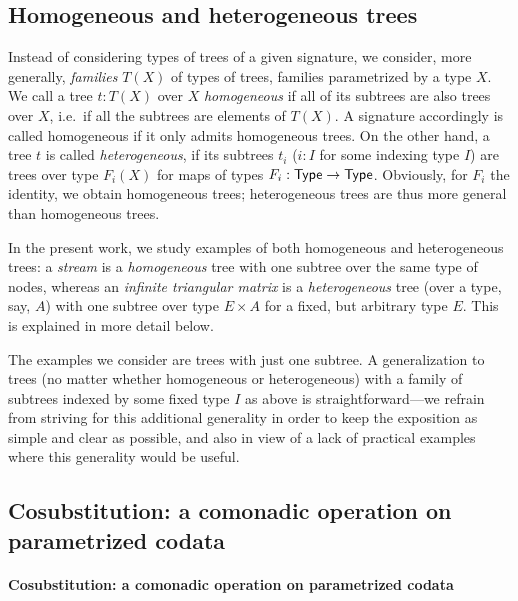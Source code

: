 \documentclass[a4paper,USenglish]{lipics}
\begin{document}
\subsection{Homogeneous and heterogeneous trees}\label{sec:hom_het}

Instead of considering types of trees of a given signature, we consider, more generally, \emph{families} $T(X)$ of types of trees, families parametrized by a type $X$.
We call a tree $t:T(X)$ over $X$ \emph{homogeneous} if all of its subtrees are also trees over $X$, i.e.\, if all the subtrees are elements of $T(X)$.
A signature accordingly is called homogeneous if it only admits homogeneous trees.
On the other hand, a tree $t$ is called \emph{heterogeneous}, if its subtrees $t_i$ ($i : I$ for some indexing type $I$) are trees over 
type $F_i(X)$ for maps of types $F_i : \mathsf{Type} \to \mathsf{Type}$. Obviously, for $F_i$ the identity, we obtain homogeneous trees; heterogeneous trees are thus more general than
homogeneous trees.

In the present work, we study examples of both homogeneous and heterogeneous trees: a \emph{stream} is a \emph{homogeneous} tree with one subtree over the same type of nodes,
whereas an \emph{infinite triangular matrix} is a \emph{heterogeneous} tree (over a type, say, $A$) with one subtree over type $E\times A$ for a fixed, but arbitrary type $E$.
This is explained in more detail below.

The examples we consider are trees with just one subtree. A generalization to trees (no matter whether homogeneous or heterogeneous) with a family of subtrees indexed by some fixed type $I$ as above is straightforward---we refrain from striving for this additional generality in order to keep the exposition as simple and clear as possible, and also in view of a lack of practical examples where this generality would be useful.

 
\begin{Long} 
 \subsection{Cosubstitution: a comonadic operation on parametrized codata}\label{sec:cosubst}
\end{Long}
\begin{Short}
 \paragraph*{Cosubstitution: a comonadic operation on parametrized codata}
\end{Short}
\end{document}
